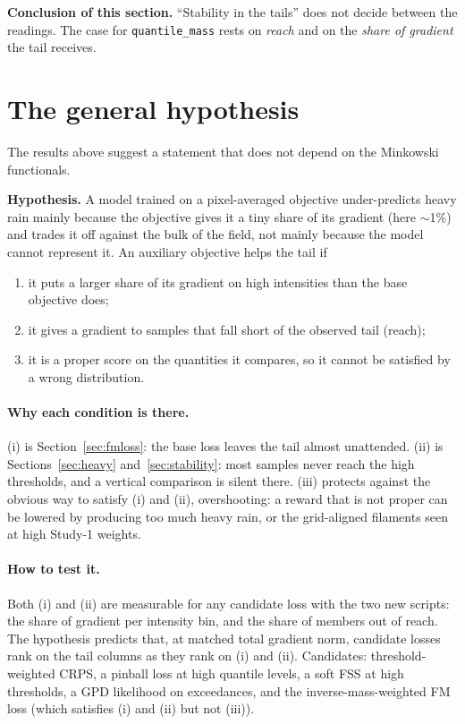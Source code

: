 \documentclass[11pt,a4paper]{article}
\begin{document}
\noindent \textbf{Conclusion of this section.} ``Stability in the tails'' does not decide between the readings. The case
for \texttt{quantile\_mass} rests on \emph{reach} and on the \emph{share of gradient} the tail receives.

\section{The general hypothesis}\label{sec:hypothesis}

The results above suggest a statement that does not depend on the Minkowski functionals.

\begin{keybox}
\textbf{Hypothesis.} A model trained on a pixel-averaged objective under-predicts heavy rain mainly because the objective
gives it a tiny share of its gradient (here $\sim$1\%) and trades it off against the bulk of the field, not mainly
because the model cannot represent it. An auxiliary objective helps the tail if
\begin{enumerate}[nosep,label=(\roman*)]
\item it puts a larger share of its gradient on high intensities than the base objective does;
\item it gives a gradient to samples that fall short of the observed tail (reach);
\item it is a proper score on the quantities it compares, so it cannot be satisfied by a wrong distribution.
\end{enumerate}
\end{keybox}

\paragraph{Why each condition is there.} (i) is Section~\ref{sec:fmloss}: the base loss leaves the tail almost unattended.
(ii) is Sections~\ref{sec:heavy} and~\ref{sec:stability}: most samples never reach the high thresholds, and a vertical
comparison is silent there. (iii) protects against the obvious way to satisfy (i) and (ii), overshooting: a reward that is
not proper can be lowered by producing too much heavy rain, or the grid-aligned filaments seen at high Study-1 weights.

\paragraph{How to test it.} Both (i) and (ii) are measurable for any candidate loss with the two new scripts:
the share of gradient per intensity bin, and the share of members out of reach. The hypothesis predicts that, at
matched total gradient norm, candidate losses rank on the tail columns as they rank on (i) and (ii). Candidates:
threshold-weighted CRPS, a pinball loss at high quantile levels, a soft FSS at high thresholds, a GPD likelihood on
exceedances, and the inverse-mass-weighted FM loss (which satisfies (i) and (ii) but not (iii)).
\end{document}
